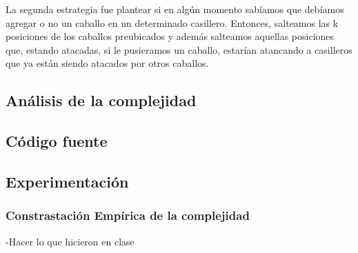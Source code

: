 La segunda estrategia fue plantear si en alg\'un momento sab\'iamos que deb\'iamos agregar o no un caballo en un determinado casillero. Entonces, salteamos las k posiciones de los caballos preubicados y adem\'as salteamos aquellas posiciones que, estando atacadas, si le pusieramos un caballo, estar\'ian atancando a casilleros que ya est\'an siendo atacados por otros caballos.\\

\newpage

\subsection{An\'alisis de la complejidad}
\newpage

\subsection{C\'odigo fuente}
\newpage
\subsection{Experimentaci\'on}

\subsubsection{Constrastaci\'on Emp\'irica de la complejidad}
-Hacer lo que hicieron en clase\\
\newpage
